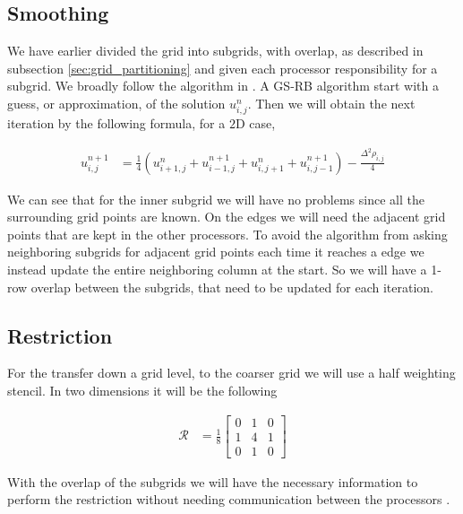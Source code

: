 	\subsection{Smoothing}

		We have earlier divided the grid into subgrids, with overlap, as described
		in subsection \ref{sec:grid_partitioning} and given each processor
		responsibility for a subgrid. We broadly follow the algorithm in \cite{adams_distributed_2001}.
		A GS-RB algorithm start with a
		guess, or approximation, of the solution \(u^{n}_{i,j}\). Then we will obtain the next iteration by
		the following formula, for a \(2\)D case,

		\begin{align}
			u^{n+1}_{i,j} &= \frac{1}{4}\left( u^n_{i+1,j} + u^{n +1}_{i-1,j} + u^{n}_{i, j+1} + u^{n+1}_{i,j-1}  \right) - \frac{\Delta^2 \rho_{i,j}}{4}
		\end{align}

		We can see that for the inner subgrid we will have no problems since
		all the surrounding grid points are known. On the edges we will need the adjacent
		grid points that are kept in the other processors. To avoid the algorithm
		from asking neighboring subgrids for adjacent grid points each time it
		reaches a edge we instead update the entire neighboring column at the start.
		So we will have a 1-row overlap between the subgrids, that need to be updated
		for each iteration.


	\subsection{Restriction}
		For the transfer down a grid level, to the coarser grid we will use a half
		weighting stencil. In two dimensions it will be the following

		\begin{align}
			\mathcal{R} &= \frac{1}{8}
			\begin{bmatrix}
				0 & 1 & 0
				\\
				1 & 4 & 1
				\\
				0 & 1 & 0
			\end{bmatrix}
		\end{align}

		With the overlap of the subgrids we will have the necessary information to
		perform the restriction without needing communication between the processors
		\citep{hackbusch_multigrid_1982}.

